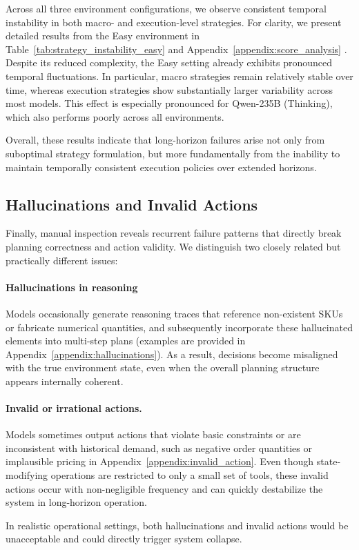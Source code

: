 Across all three environment configurations, we observe consistent temporal instability in both macro- and execution-level strategies. For clarity, we present detailed results from the Easy environment in Table~\ref{tab:strategy_instability_easy} and Appendix~\ref{appendix:score_analysis} . Despite its reduced complexity, the Easy setting already exhibits pronounced temporal fluctuations. In particular, macro strategies remain relatively stable over time, whereas execution strategies show substantially larger variability across most models. This effect is especially pronounced for Qwen-235B (Thinking), which also performs poorly across all environments.

Overall, these results indicate that long-horizon failures arise not only from suboptimal strategy formulation, but more fundamentally from the inability to maintain temporally consistent execution policies over extended horizons.
\subsection{Hallucinations and Invalid Actions}

Finally, manual inspection reveals recurrent failure patterns that directly break planning correctness and action validity. We distinguish two closely related but practically different issues:

\paragraph{Hallucinations in reasoning}
Models occasionally generate reasoning traces that reference non-existent SKUs or fabricate numerical quantities, and subsequently incorporate these hallucinated elements into multi-step plans (examples are provided in Appendix~\ref{appendix:hallucinations}). As a result, decisions become misaligned with the true environment state, even when the overall planning structure appears internally coherent.

  
\paragraph{Invalid or irrational actions.}
Models sometimes output actions that violate basic constraints or are inconsistent with historical demand, such as negative order quantities or implausible pricing in Appendix~\ref{appendix:invalid_action}. Even though state-modifying operations are restricted to only a small set of tools, these invalid actions occur with non-negligible frequency and can quickly destabilize the system in long-horizon operation.

In realistic operational settings, both hallucinations and invalid actions would be unacceptable and could directly trigger system collapse.

